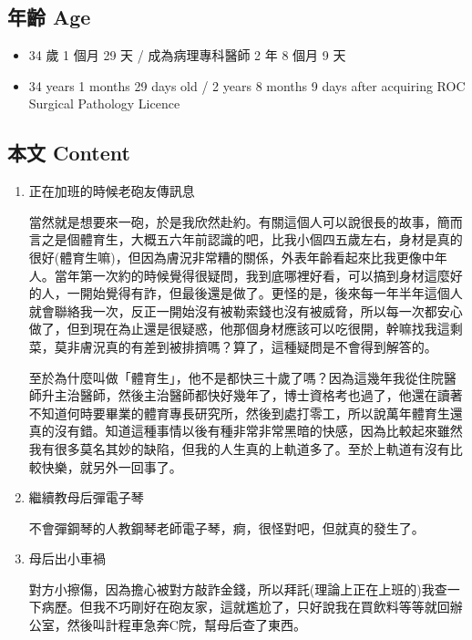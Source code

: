 \documentclass[a5paper, 11pt
]{book}
\providecommand{\tightlist}{%
  \setlength{\itemsep}{0pt}\setlength{\parskip}{0pt}}
\begin{document}
\hypertarget{ux5e74ux9f61-age-18}{%
\subsection{年齡 Age}\label{ux5e74ux9f61-age-18}}

\begin{itemize}
\tightlist
\item
  34 歲 1 個月 29 天 / 成為病理專科醫師 2 年 8 個月 9 天
\item
  34 years 1 months 29 days old / 2 years 8 months 9 days after
  acquiring ROC Surgical Pathology Licence
\end{itemize}

\hypertarget{ux672cux6587-content-18}{%
\subsection{本文 Content}\label{ux672cux6587-content-18}}

\begin{enumerate}
\def\labelenumi{\arabic{enumi}.}
\item
  正在加班的時候老砲友傳訊息

  當然就是想要來一砲，於是我欣然赴約。有關這個人可以說很長的故事，簡而言之是個體育生，大概五六年前認識的吧，比我小個四五歲左右，身材是真的很好(體育生嘛)，但因為膚況非常糟的關係，外表年齡看起來比我更像中年人。當年第一次約的時候覺得很疑問，我到底哪裡好看，可以搞到身材這麼好的人，一開始覺得有詐，但最後還是做了。更怪的是，後來每一年半年這個人就會聯絡我一次，反正一開始沒有被勒索錢也沒有被威脅，所以每一次都安心做了，但到現在為止還是很疑惑，他那個身材應該可以吃很開，幹嘛找我這剩菜，莫非膚況真的有差到被排擠嗎？算了，這種疑問是不會得到解答的。

  至於為什麼叫做「體育生」，他不是都快三十歲了嗎？因為這幾年我從住院醫師升主治醫師，然後主治醫師都快好幾年了，博士資格考也過了，他還在讀著不知道何時要畢業的體育專長研究所，然後到處打零工，所以說萬年體育生還真的沒有錯。知道這種事情以後有種非常非常黑暗的快感，因為比較起來雖然我有很多莫名其妙的缺陷，但我的人生真的上軌道多了。至於上軌道有沒有比較快樂，就另外一回事了。
\item
  繼續教母后彈電子琴

  不會彈鋼琴的人教鋼琴老師電子琴，痾，很怪對吧，但就真的發生了。
\item
  母后出小車禍

  對方小擦傷，因為擔心被對方敲詐金錢，所以拜託(理論上正在上班的)我查一下病歷。但我不巧剛好在砲友家，這就尷尬了，只好說我在買飲料等等就回辦公室，然後叫計程車急奔C院，幫母后查了東西。
\end{enumerate}
\end{document}
